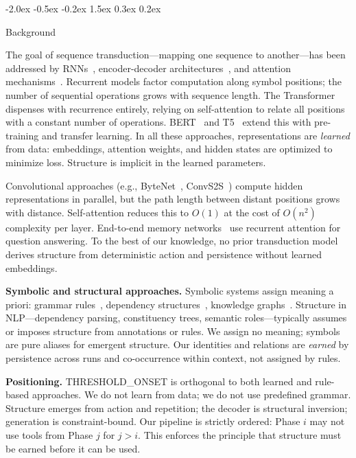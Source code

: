 \documentclass[10pt]{article}
\makeatletter
\renewcommand{\section}{\@startsection{section}{1}{\z@}%
  {-2.0ex \@plus -0.5ex \@minus -0.2ex}%
  {1.5ex \@plus 0.3ex \@minus 0.2ex}%
  {\large\bfseries\raggedright}}
\makeatother
\begin{document}
\section{Background}
\label{sec:background}

The goal of sequence transduction---mapping one sequence to another---has been addressed by RNNs~\cite{hochreiter1997long}, encoder-decoder architectures~\cite{sutskever2014sequence}, and attention mechanisms~\cite{bahdanau2015neural}. Recurrent models factor computation along symbol positions; the number of sequential operations grows with sequence length. The Transformer~\cite{vaswani2017attention} dispenses with recurrence entirely, relying on self-attention to relate all positions with a constant number of operations. BERT~\cite{devlin2019bert} and T5~\cite{raffel2019t5} extend this with pre-training and transfer learning. In all these approaches, representations are \emph{learned} from data: embeddings, attention weights, and hidden states are optimized to minimize loss. Structure is implicit in the learned parameters.

Convolutional approaches (e.g., ByteNet~\cite{kalchbrenner2016bytenet}, ConvS2S~\cite{gehring2017conv}) compute hidden representations in parallel, but the path length between distant positions grows with distance. Self-attention reduces this to $O(1)$ at the cost of $O(n^2)$ complexity per layer. End-to-end memory networks~\cite{sukhbaatar2015end} use recurrent attention for question answering. To the best of our knowledge, no prior transduction model derives structure from deterministic action and persistence without learned embeddings.

\textbf{Symbolic and structural approaches.}
Symbolic systems assign meaning a priori: grammar rules~\cite{chomsky1957syntactic}, dependency structures~\cite{de2008dependency}, knowledge graphs~\cite{lehmann2015dbpedia}. Structure in NLP---dependency parsing, constituency trees, semantic roles---typically assumes or imposes structure from annotations or rules. We assign no meaning; symbols are pure aliases for emergent structure. Our identities and relations are \emph{earned} by persistence across runs and co-occurrence within context, not assigned by rules.

\textbf{Positioning.}
THRESHOLD\_ONSET is orthogonal to both learned and rule-based approaches. We do not learn from data; we do not use predefined grammar. Structure emerges from action and repetition; the decoder is structural inversion; generation is constraint-bound. Our pipeline is strictly ordered: Phase $i$ may not use tools from Phase $j$ for $j > i$. This enforces the principle that structure must be earned before it can be used.
\end{document}

